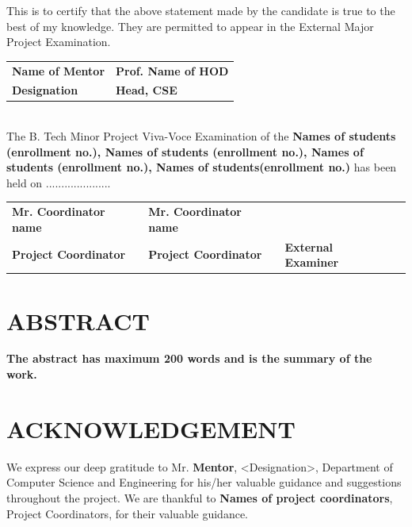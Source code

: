 \documentclass{article}
\begin{document}
    This is to certify that the above statement made by the candidate is true to the best of my knowledge. They are permitted to appear in the External Major Project Examination.\\[1.5cm]

    \noindent
    \begin{tabularx}{\textwidth}{X X}
            \textbf{\small Name of Mentor} & \textbf{\small Prof. Name of HOD} \\
            \textbf{\small Designation} & \textbf{\small Head, CSE}\\
    \end{tabularx}\\[1cm]

    The B. Tech Minor Project Viva-Voce Examination of the \textbf{Names of students (enrollment no.), Names of students (enrollment no.), Names of students (enrollment no.), Names of students(enrollment no.)} has been held on .....................\\[1.5cm]

    \noindent    
    \begin{tabularx}{\textwidth}{X X X X}
        \textbf{\small Mr. Coordinator name} &  \textbf{\small Mr. Coordinator name} &  \\
        \textbf{\small Project Coordinator} & \textbf{\small Project Coordinator} & \textbf{\small External Examiner}
    \end{tabularx}
    
\chapter*{\centering \textbf{\Large ABSTRACT}}

    \textbf{The abstract has maximum 200 words and is the summary of the work.}


\chapter*{\centering \textbf{\Large ACKNOWLEDGEMENT}}

    We express our deep gratitude to Mr. \textbf{Mentor}, <Designation>, Department of Computer Science and Engineering for his/her valuable guidance and suggestions throughout the project. We are thankful to \textbf{Names of project coordinators}, Project Coordinators, for their valuable guidance.\\[1cm]
\end{document}
